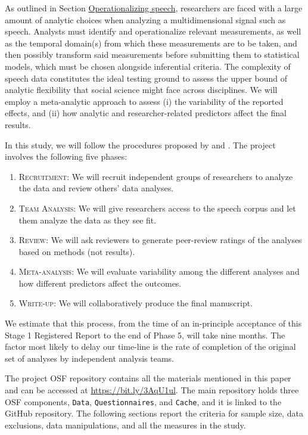 \documentclass[Review,times,sageh]{sagej}
\providecommand{\tightlist}{\setlength{\itemsep}{0pt}\setlength{\parskip}{0pt}}
\begin{document}
As outlined in Section \protect\hyperlink{s:operspeech}{Operationalizing speech}, researchers are faced with a large amount of analytic choices when analyzing a multidimensional signal such as speech.
Analysts must identify and operationalize relevant measurements, as well as the temporal domain(s) from which these measurements are to be taken, and then possibly transform said measurements before submitting them to statistical models, which must be chosen alongside inferential criteria.
The complexity of speech data constitutes the ideal testing ground to assess the upper bound of analytic flexibility that social science might face across disciplines.
We will employ a meta-analytic approach to assess (i) the variability of the reported effects, and (ii) how analytic and researcher-related predictors affect the final results.

In this study, we will follow the procedures proposed by \citet{Parker2020} and \citet{aczel2021}.
The project involves the following five phases:

\begin{enumerate}
\def\labelenumi{\arabic{enumi}.}
\tightlist
\item
  \textsc{Recruitment}: We will recruit independent groups of researchers to analyze the data and review others' data analyses.
\item
  \textsc{Team Analysis}: We will give researchers access to the speech corpus and let them analyze the data as they see fit.
\item
  \textsc{Review}: We will ask reviewers to generate peer-review ratings of the analyses based on methods (not results).
\item
  \textsc{Meta-analysis}: We will evaluate variability among the different analyses and how different predictors affect the outcomes.
\item
  \textsc{Write-up}: We will collaboratively produce the final manuscript.
\end{enumerate}

We estimate that this process, from the time of an in-principle acceptance of this Stage 1 Registered Report to the end of Phase 5, will take nine months.
The factor most likely to delay our time-line is the rate of completion of the original set of analyses by independent analysis teams.

The project OSF repository contains all the materials mentioned in this paper and can be accessed at \url{https://bit.ly/3AqU1ul}.
The main repository holds three OSF components, \texttt{Data}, \texttt{Questionnaires}, and \texttt{Cache}, and it is linked to the GitHub repository.
The following sections report the criteria for sample size, data exclusions, data manipulations, and all the measures in the study.
\end{document}
